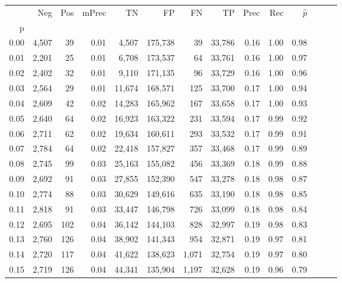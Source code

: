 \begin{tabular}{rrrrrrrrrrrrrr}
\toprule
{} &    Neg &    Pos & mPrec &       TN &       FP &      FN &      TP &  Prec &   Rec & $\hat{p}$ \\
p    &        &        &       &          &          &         &         &       &       &           \\
\midrule
0.00 &  4,507 &     39 &  0.01 &    4,507 &  175,738 &      39 &  33,786 &  0.16 &  1.00 &      0.98 \\
0.01 &  2,201 &     25 &  0.01 &    6,708 &  173,537 &      64 &  33,761 &  0.16 &  1.00 &      0.97 \\
0.02 &  2,402 &     32 &  0.01 &    9,110 &  171,135 &      96 &  33,729 &  0.16 &  1.00 &      0.96 \\
0.03 &  2,564 &     29 &  0.01 &   11,674 &  168,571 &     125 &  33,700 &  0.17 &  1.00 &      0.94 \\
0.04 &  2,609 &     42 &  0.02 &   14,283 &  165,962 &     167 &  33,658 &  0.17 &  1.00 &      0.93 \\
0.05 &  2,640 &     64 &  0.02 &   16,923 &  163,322 &     231 &  33,594 &  0.17 &  0.99 &      0.92 \\
0.06 &  2,711 &     62 &  0.02 &   19,634 &  160,611 &     293 &  33,532 &  0.17 &  0.99 &      0.91 \\
0.07 &  2,784 &     64 &  0.02 &   22,418 &  157,827 &     357 &  33,468 &  0.17 &  0.99 &      0.89 \\
0.08 &  2,745 &     99 &  0.03 &   25,163 &  155,082 &     456 &  33,369 &  0.18 &  0.99 &      0.88 \\
0.09 &  2,692 &     91 &  0.03 &   27,855 &  152,390 &     547 &  33,278 &  0.18 &  0.98 &      0.87 \\
0.10 &  2,774 &     88 &  0.03 &   30,629 &  149,616 &     635 &  33,190 &  0.18 &  0.98 &      0.85 \\
0.11 &  2,818 &     91 &  0.03 &   33,447 &  146,798 &     726 &  33,099 &  0.18 &  0.98 &      0.84 \\
0.12 &  2,695 &    102 &  0.04 &   36,142 &  144,103 &     828 &  32,997 &  0.19 &  0.98 &      0.83 \\
0.13 &  2,760 &    126 &  0.04 &   38,902 &  141,343 &     954 &  32,871 &  0.19 &  0.97 &      0.81 \\
0.14 &  2,720 &    117 &  0.04 &   41,622 &  138,623 &   1,071 &  32,754 &  0.19 &  0.97 &      0.80 \\
0.15 &  2,719 &    126 &  0.04 &   44,341 &  135,904 &   1,197 &  32,628 &  0.19 &  0.96 &      0.79 \\

\end{tabular}
